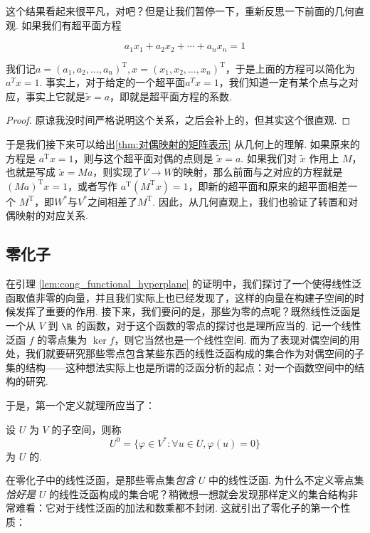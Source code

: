 这个结果看起来很平凡，对吧？但是让我们暂停一下，重新反思一下前面的几何直观. 如果我们有超平面方程

\[
    a_1 x_1 + a_2 x_2 + \cdots + a_n x_n = 1
\]

我们记$a=(a_1,a_2,\ldots,a_n)^\mathrm{T},x=(x_1,x_2,\ldots,x_n)^\mathrm{T}$，于是上面的方程可以简化为$a^T x = 1$. 事实上，对于给定的一个超平面$a^T x = 1$，我们知道一定有某个点与之对应，事实上它就是$\tilde{x} = a$，即就是超平面方程的系数.
\begin{proof}
    原谅我没时间严格说明这个关系，之后会补上的，但其实这个很直观.
\end{proof}

于是我们接下来可以给出\autoref{thm:对偶映射的矩阵表示} 从几何上的理解. 如果原来的方程是 $a^\mathrm{T} x = 1$，则与这个超平面对偶的点则是 $\tilde{x} = a$. 如果我们对 $\tilde{x}$ 作用上 $M$，也就是写成 $\tilde{x} = Ma$，则实现了$V\to W$的映射，那么前面与之对应的方程就是 $(Ma)^\mathrm{T} x = 1$，或者写作 $a^\mathrm{T} (M^\mathrm{T} x) = 1$，即新的超平面和原来的超平面相差一个 $M^\mathrm{T}$，即$W^*$与$V^*$之间相差了$M^\mathrm{T}$. 因此，从几何直观上，我们也验证了转置和对偶映射的对应关系. %

\subsection{零化子}

在引理 \ref{lem:cong_functional_hyperplane} 的证明中，我们探讨了一个使得线性泛函取值非零的向量，并且我们实际上也已经发现了，这样的向量在构建子空间的时候发挥了重要的作用. 接下来，我们要问的是，那些为零的点呢？既然线性泛函是一个从 $V$ 到 $\R$ 的函数，对于这个函数的零点的探讨也是理所应当的. 记一个线性泛函 $f$ 的零点集为 $\ker f$，则它当然也是一个线性空间. 而为了表现对偶空间的用处，我们就要研究那些零点包含某些东西的线性泛函构成的集合作为对偶空间的子集的结构——这种想法实际上也是所谓的泛函分析的起点：对一个函数空间中的结构的研究.

于是，第一个定义就理所应当了：

\begin{definition}{}{}
    设 $U$ 为 $V$ 的子空间，则称
    \[
        U^0 = \{\varphi \in V^*: \forall u \in U, \varphi(u) = 0\}
    \]
    为 $U$ 的.
\end{definition}

在零化子中的线性泛函，是那些零点集\emph{包含} $U$ 中的线性泛函. 为什么不定义零点集\emph{恰好是} $U$ 的线性泛函构成的集合呢？稍微想一想就会发现那样定义的集合结构非常难看：它对于线性泛函的加法和数乘都不封闭. 这就引出了零化子的第一个性质：

